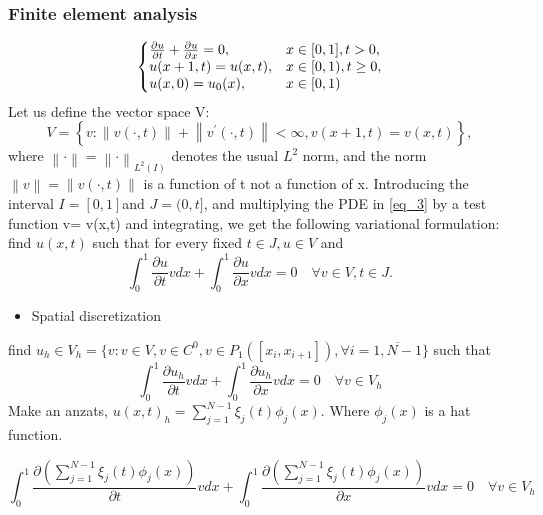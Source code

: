 \documentclass[a4paper,10pt,twoside]{article}
\begin{document}

\subsubsection{Finite element analysis}
\begin{equation}
  \left\{
  \begin{array}{@{}ll@{}}
    \frac{\partial u }{\partial t} + \frac{\partial u}{\partial x}= 0, & x \in [0,1], t>0,\\
    u(x+1, t) = u(x, t), & x \in [0,1), t \geq 0,\\
    u(x,0) = u_0(x), & x \in [0,1)
  \end{array}\right.
  \label{eq_3}
\end{equation}
Let us define the vector space V:
\begin{equation}
  V = \left\{  v:\left\| v(\cdot,t) \right\|  + \left\| {  v}^{  '}(\cdot,t) \right\| < \infty, v(x+1, t) = v(x, t) \right\},
  \label{eq_4}
\end{equation}
where $ \left\| \cdot \right\| ={ \left\| \cdot  \right\|  }_{ L^2(I) } $ denotes the usual $L^2$ norm, and the norm $  \left\| v\right\| =  \left\| v( \cdot,t )\right\|$ is a function of t not a function of x. Introducing the interval $I= [0,1] $and $ J= (0,t] $, and multiplying the PDE in \ref{eq_3} by a test function v= v(x,t) and integrating, we get the following variational formulation: 
find $u(x,t)$ such that for every fixed $t \in J, u \in V$ and
\begin{equation}
    \int_0^1 \frac{\partial u}{\partial t}v dx+ \int_0^1 \frac{\partial u}{\partial x}v dx= 0 \quad\forall v \in V, t \in J.
    \label{eq_5}
\end{equation}
\begin{itemize}
    \item Spatial discretization
\end{itemize}

find $u_h \in V_h = \{v: v \in V, v \in C^0, v \in P_1([x_i,x_{i+1}]), \forall i=\overline{1,N-1}\}$ such that 
\begin{equation}
    \int_0^1 \frac{\partial u_h}{\partial t}v dx+ \int_0^1 \frac{\partial u_h}{\partial x}v dx= 0 \quad\forall v \in V_h
\end{equation}
Make an anzats, $u(x,t)_h = \sum\limits_{j=1}^{N-1} \xi_j(t)\phi_j(x)$. Where $\phi_j(x)$ is a hat function.

\begin{equation}
    \int_0^1 \frac{\partial \left(\sum\limits_{j=1}^{N-1} \xi_j(t)\phi_j(x)\right)}{\partial t}v dx+ \int_0^1 \frac{\partial \left(\sum\limits_{j=1}^{N-1} \xi_j(t)\phi_j(x)\right)}{\partial x}v dx= 0 \quad\forall v \in V_h
\end{equation}
\end{document}
